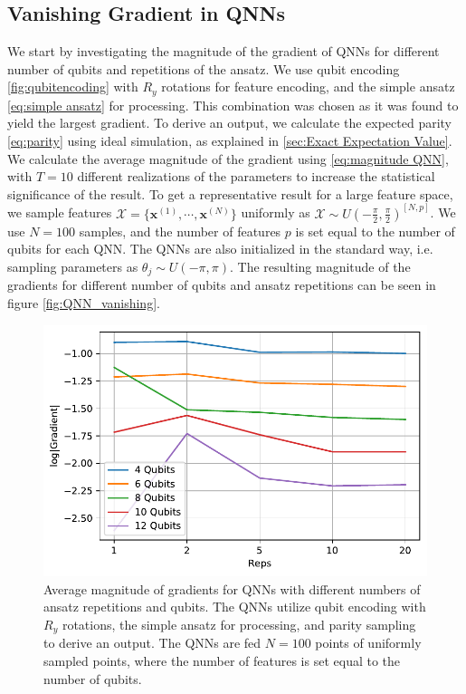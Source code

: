 \subsection{Vanishing Gradient in QNNs}\label{sec:Vanishing Gradient for QNNs}
We start by investigating the magnitude of the gradient of QNNs for different number of qubits and repetitions of the ansatz. We use qubit encoding \autoref{fig:qubitencoding} with $R_y$ rotations for feature encoding, and the simple ansatz \autoref{eq:simple ansatz} for processing. This combination was chosen as it was found to yield the largest gradient. To derive an output, we calculate the expected parity \autoref{eq:parity} using ideal simulation, as explained in \autoref{sec:Exact Expectation Value}. We calculate the average magnitude of the gradient using \autoref{eq:magnitude QNN}, with $T=10$ different realizations of the parameters to increase the statistical significance of the result. To get a representative result for a large feature space, we sample features $\mathcal{X} = \{\boldsymbol{x}^{(1)}, \cdots, \boldsymbol{x}^{(N)}\}$ uniformly as $\mathcal{X} \sim U(-\frac{\pi}{2}, \frac{\pi}{2})^{[N,p]}$. We use $N=100$ samples, and the number of features $p$ is set equal to the number of qubits for each QNN. The QNNs are also initialized in the standard way, i.e. sampling parameters as $\theta_j \sim U(-\pi, \pi)$. The resulting magnitude of the gradients for different number of qubits and ansatz repetitions can be seen in figure \autoref{fig:QNN_vanishing}.

\begin{figure}[H]
    \centering
    \includegraphics[width=12cm]{latex/figures/vanishing_gradient_QNN.pdf}
    \caption{Average magnitude of gradients for QNNs with different numbers of ansatz repetitions and qubits. The QNNs utilize qubit encoding with $R_y$ rotations, the simple ansatz for processing, and parity sampling to derive an output. The QNNs are fed $N=100$ points of uniformly sampled points, where the number of features is set equal to the number of qubits.}
    \label{fig:QNN_vanishing}
\end{figure}

